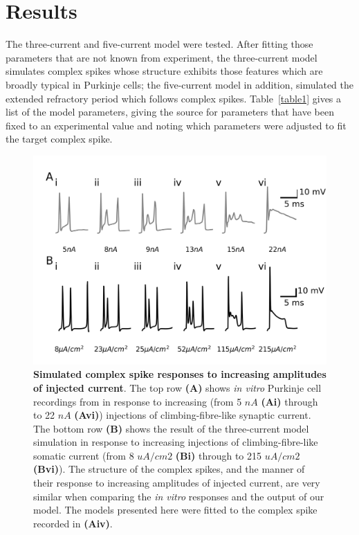 \documentclass[twocolumn]{svjour3}          %
\begin{document}
\section{Results}

The three-current and five-current model were tested. After fitting
those parameters that are not known from experiment, the three-current
model simulates complex spikes whose structure exhibits those features
which are broadly typical in Purkinje cells; the five-current model in
addition, simulated the extended refractory period which follows
complex spikes. Table~\ref{table1} gives a list of the model
parameters, giving the source for parameters that have been fixed to
an experimental value and noting which parameters were adjusted to
fit the target complex spike.


\begin{figure}[!ht]
\includegraphics[width=\linewidth]{Figure1.png}
\caption{\textbf{Simulated complex spike responses to increasing
    amplitudes of injected current}. The top row \textbf{(A)} shows \textsl{in
    vitro} Purkinje cell recordings from \protect\citet{DavieEtAl2008} in response to increasing (from 5 $nA$ \textbf{(Ai)} through to 22 $nA$ \textbf{(Avi)}) injections of climbing-fibre-like synaptic current. The bottom row \textbf{(B)} shows
  the result of the three-current model simulation in response to increasing injections of climbing-fibre-like somatic current (from 8 $uA/cm2$ \textbf{(Bi)} through to 215 $uA/cm2$ \textbf{(Bvi)}). The structure of the complex spikes, and the manner of their response to increasing amplitudes of injected current, are very similar when comparing the \textsl{in vitro} responses and the output of our model. The models presented here were fitted to the complex spike recorded in \textbf{(Aiv)}.}
\label{injection_amplitudes}
\end{figure}
\end{document}
